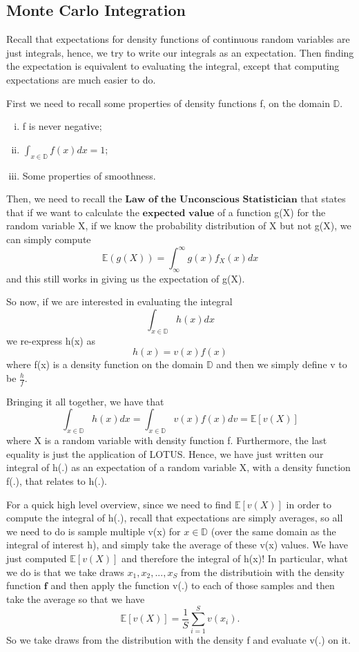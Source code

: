 \documentclass[twoside]{article}
\begin{document}
\subsection{Monte Carlo Integration}
Recall that expectations for density functions of continuous random variables are just integrals, hence, we try to write our integrals as an expectation. Then finding the expectation is equivalent to evaluating the integral, except that computing expectations are much easier to do.

First we need to recall some properties of density functions f, on the domain $\mathbb{D}$.
\begin{enumerate}[(i)]
  \item f is never negative;
  \item $\int_{x \in \mathbb{D}}f(x)dx = 1$;
  \item Some properties of smoothness. 
\end{enumerate}

Then, we need to recall the $\textbf{Law of the Unconscious Statistician}$ that states that if we want to calculate the $\textbf{expected value}$ of a function g(X) for the random variable X, if we know the probability distribution of X but not g(X), we can simply compute 
$$
\mathbb{E}(g(X)) = \int_{\infty}^{\infty}g(x)f_X(x)dx
$$ 
and this still works in giving us the expectation of g(X).

So now, if we are interested in evaluating the integral
$$
\int_{x \in \mathbb{D}}h(x)dx
$$
we re-express h(x) as
$$
h(x) = v(x)f(x)
$$
where f(x) is a density function on the domain $\mathbb{D}$ and then we simply define v to be $\frac{h}{f}$.

Bringing it all together, we have that 
$$
\int_{x \in \mathbb{D}}h(x)dx = \int_{x \in \mathbb{D}}v(x)f(x)dv = \mathbb{E}[v(X)]
$$
where X is a random variable with density function f. Furthermore, the last equality is just the application of LOTUS. Hence, we have just written our integral of h(.) as an expectation of a random variable X, with a density function f(.), that relates to h(.). 

For a quick high level overview, since we need to find $\mathbb{E}[v(X)]$ in order to compute the integral of h(.), recall that expectations are simply averages, so all we need to do is sample multiple v(x) for $x \in \mathbb{D}$ (over the same domain as the integral of interest h), and simply take the average of these v(x) values. We have just computed $\mathbb{E}[v(X)]$ and therefore the integral of h(x)! In particular, what we do is that we take draws $x_1, x_2, ..., x_S$ from the distributioin with the density function $\mathbf{f}$ and then apply the function v(.) to each of those samples and then take the average so that we have
$$
\mathbb{E}[v(X)] = \frac{1}{S}\sum_{i=1}^Sv(x_i).
$$
So we take draws from the distribution with the density f and evaluate v(.) on it.
\end{document}
